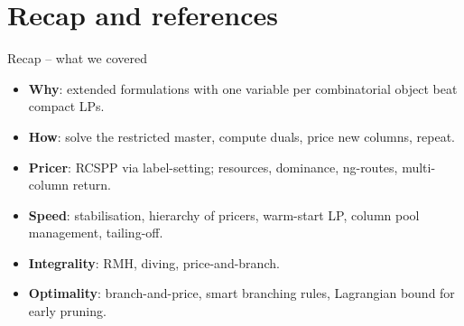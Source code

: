 \documentclass[10pt,aspectratio=169]{beamer}
\begin{document}
\section{Recap and references}

\begin{frame}{Recap -- what we covered}
  \begin{itemize}\small
    \item \textbf{Why}: extended formulations with one variable per
          combinatorial object beat compact LPs.
    \item \textbf{How}: solve the restricted master, compute duals, price
          new columns, repeat.
    \item \textbf{Pricer}: RCSPP via label-setting; resources, dominance,
          ng-routes, multi-column return.
    \item \textbf{Speed}: stabilisation, hierarchy of pricers, warm-start
          LP, column pool management, tailing-off.
    \item \textbf{Integrality}: RMH, diving, price-and-branch.
    \item \textbf{Optimality}: branch-and-price, smart branching rules,
          Lagrangian bound for early pruning.
  \end{itemize}
\end{frame}
\end{document}
